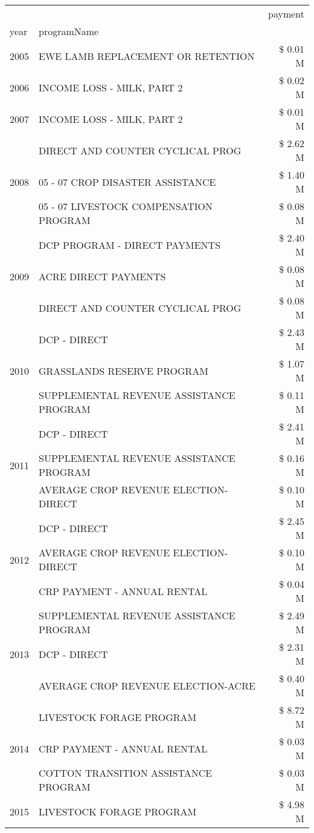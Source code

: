 \begin{tabular}{llr}
\toprule
 &  & payment \\
year & programName &  \\
\midrule
2005 & EWE LAMB REPLACEMENT OR RETENTION & \$ 0.01 M \\
\cline{1-3}
2006 & INCOME LOSS - MILK, PART 2 & \$ 0.02 M \\
\cline{1-3}
2007 & INCOME LOSS - MILK, PART 2 & \$ 0.01 M \\
\cline{1-3}
\multirow[t]{3}{*}{2008} & DIRECT AND COUNTER CYCLICAL PROG & \$ 2.62 M \\
 & 05 - 07 CROP DISASTER ASSISTANCE & \$ 1.40 M \\
 & 05 - 07 LIVESTOCK COMPENSATION PROGRAM & \$ 0.08 M \\
\cline{1-3}
\multirow[t]{3}{*}{2009} & DCP PROGRAM - DIRECT PAYMENTS & \$ 2.40 M \\
 & ACRE DIRECT PAYMENTS & \$ 0.08 M \\
 & DIRECT AND COUNTER CYCLICAL PROG & \$ 0.08 M \\
\cline{1-3}
\multirow[t]{3}{*}{2010} & DCP - DIRECT & \$ 2.43 M \\
 & GRASSLANDS RESERVE PROGRAM & \$ 1.07 M \\
 & SUPPLEMENTAL REVENUE ASSISTANCE PROGRAM & \$ 0.11 M \\
\cline{1-3}
\multirow[t]{3}{*}{2011} & DCP - DIRECT & \$ 2.41 M \\
 & SUPPLEMENTAL REVENUE ASSISTANCE PROGRAM & \$ 0.16 M \\
 & AVERAGE CROP REVENUE ELECTION-DIRECT & \$ 0.10 M \\
\cline{1-3}
\multirow[t]{3}{*}{2012} & DCP - DIRECT & \$ 2.45 M \\
 & AVERAGE CROP REVENUE ELECTION-DIRECT & \$ 0.10 M \\
 & CRP PAYMENT - ANNUAL RENTAL & \$ 0.04 M \\
\cline{1-3}
\multirow[t]{3}{*}{2013} & SUPPLEMENTAL REVENUE ASSISTANCE PROGRAM & \$ 2.49 M \\
 & DCP - DIRECT & \$ 2.31 M \\
 & AVERAGE CROP REVENUE ELECTION-ACRE & \$ 0.40 M \\
\cline{1-3}
\multirow[t]{3}{*}{2014} & LIVESTOCK FORAGE PROGRAM & \$ 8.72 M \\
 & CRP PAYMENT - ANNUAL RENTAL & \$ 0.03 M \\
 & COTTON TRANSITION ASSISTANCE PROGRAM & \$ 0.03 M \\
\cline{1-3}
\multirow[t]{3}{*}{2015} & LIVESTOCK FORAGE PROGRAM & \$ 4.98 M \\

\end{tabular}
